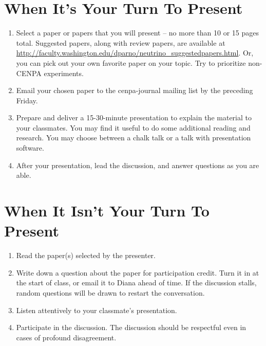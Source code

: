 \documentclass[12pt]{amsart}
\begin{document}
\section{When It's Your Turn To Present}
\begin{enumerate}
	\item	Select a paper or papers that you will present -- no more than 10 or 15 pages total. Suggested papers, along with review papers, are available at \url{http://faculty.washington.edu/dparno/neutrino_suggestedpapers.html}. Or, you can pick out your own favorite paper on your topic. Try to prioritize non-CENPA experiments. 
	\item	Email your chosen paper to the cenpa-journal mailing list by the preceding Friday.
	\item	Prepare and deliver a 15-30-minute presentation to explain the material to your classmates. You may find it useful to do some additional reading and research. You may choose between a chalk talk or a talk with presentation software.
	\item	After your presentation, lead the discussion, and answer questions as you are able.
\end{enumerate}

\section{When It Isn't Your Turn To Present}
\begin{enumerate}
	\item	Read the paper(s) selected by the presenter.
	\item	Write down a question about the paper for participation credit. Turn it in at the start of class, or email it to Diana ahead of time. If the discussion stalls, random questions will be drawn to restart the conversation.
	\item	Listen attentively to your classmate's presentation.
	\item	Participate in the discussion. The discussion should be respectful even in cases of profound disagreement.
\end{enumerate}
\end{document}
